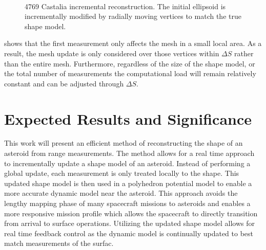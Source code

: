 \documentclass[letterpaper, paper,11pt]{AAS}		%
\begin{document}
\begin{figure}[h]
~
\caption{4769 Castalia incremental reconstruction. The initial ellipsoid is incrementally modified by radially moving vertices to match the true shape model.~\label{fig:reconstruction}}
\end{figure}
 shows that the first measurement only affects the mesh in a small local area.
As a result, the mesh update is only considered over those vertices within \( \Delta S \) rather than the entire mesh. 
Furthermore, regardless of the size of the shape model, or the total number of measurements the computational load will remain relatively constant and can be adjusted through \( \Delta S\).

\section{Expected Results and Significance}
This work will present an efficient method of reconstructing the shape of an asteroid from range measurements. 
The method allows for a real time approach to incrementally update a shape model of an asteroid.
Instead of performing a global update, each measurement is only treated locally to the shape. 
This updated shape model is then used in a polyhedron potential model to enable a more accurate dynamic model near the asteroid.
This approach avoids the lengthy mapping phase of many spacecraft missions to asteroids and enables a more responsive mission profile which allows the spacecraft to directly transition from arrival to surface operations.
Utilizing the updated shape model allows for real time feedback control as the dynamic model is continually updated to best match measurements of the surfac.

 

\end{document}
